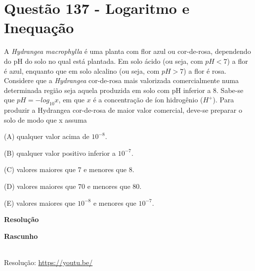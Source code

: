\section{Questão 137 - Logaritmo e Inequação}

A \textit{Hydrangea macrophylla} é uma planta com flor azul ou cor-de-rosa, dependendo do pH do solo no qual está plantada. Em solo ácido (ou seja, com $ pH < 7 $) a flor é azul, enquanto que em solo alcalino (ou seja, com $ pH > 7 $) a flor é rosa. Considere que a \textit{Hydrangea} cor-de-rosa mais valorizada comercialmente numa determinada região seja aquela produzida em solo com pH inferior a 8. 
Sabe-se que $ pH = - log_{10} x $, em que $ x $ é a concentração de íon hidrogênio ($ H^+ $).
Para produzir a Hydrangea cor-de-rosa de maior valor comercial, deve-se preparar o solo de modo que x assuma

\noindent (A) qualquer valor acima de $ 10^{-8} $.

\noindent (B) qualquer valor positivo inferior a $ 10^{-7} $.

\noindent (C) valores maiores que 7 e menores que 8.

\noindent (D) valores maiores que 70 e menores que 80.

\noindent (E) valores maiores que $ 10^{-8} $ e menores que $ 10^{-7} $.


\textbf{Resolução}



\textbf{Rascunho}

\quad


\begin{center}
    \href{https://youtu.be/}{
    }\\
    Resolução: \url{https://youtu.be/}
\end{center}
